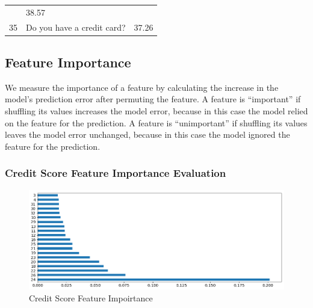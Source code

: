 \begin{longtable}[]{@{}lll@{}}
\begin{minipage}[t]{0.77\columnwidth}
\end{minipage} & \begin{minipage}[t]{0.09\columnwidth}\raggedright
38.57\strut
\end{minipage}\tabularnewline
\begin{minipage}[t]{0.05\columnwidth}\raggedright
35\strut
\end{minipage} & \begin{minipage}[t]{0.77\columnwidth}\raggedright
Do you have a credit card?\strut
\end{minipage} & \begin{minipage}[t]{0.09\columnwidth}\raggedright
37.26\strut
\end{minipage}\tabularnewline
\bottomrule
\end{longtable}

\hypertarget{feature-importance}{%
\subsection{Feature Importance}\label{feature-importance}}

We measure the importance of a feature by calculating the increase in
the model's prediction error after permuting the feature. A feature is
``important'' if shuffling its values increases the model error, because
in this case the model relied on the feature for the prediction. A
feature is ``unimportant'' if shuffling its values leaves the model
error unchanged, because in this case the model ignored the feature for
the prediction.

\hypertarget{credit-score-feature-importance-evaluation}{%
\subsubsection{Credit Score Feature Importance
Evaluation}\label{credit-score-feature-importance-evaluation}}

\begin{Schunk}
\begin{figure}[H]

{\centering \includegraphics[width=1\linewidth]{../../artifacts/cfimportance} 

}

\caption[Credit Score Feature Impoirtance]{Credit Score Feature Impoirtance}\label{fig:cfi}
\end{figure}
\end{Schunk}


